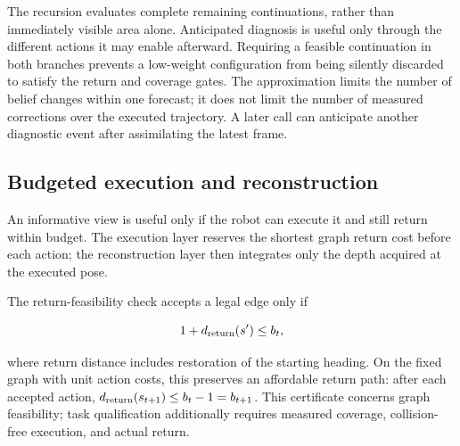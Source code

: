 \documentclass[11pt,a4paper]{article}
\providecommand{\hypertarget}[2]{#2}
\begin{document}
The recursion evaluates complete remaining continuations, rather than immediately visible area alone. Anticipated diagnosis is useful only through the different actions it may enable afterward. Requiring a feasible continuation in both branches prevents a low-weight configuration from being silently discarded to satisfy the return and coverage gates. The approximation limits the number of belief changes within one forecast; it does not limit the number of measured corrections over the executed trajectory. A later call can anticipate another diagnostic event after assimilating the latest frame.

\hypertarget{budgeted-execution-and-reconstruction}{%
\subsection{Budgeted execution and reconstruction}\label{budgeted-execution-and-reconstruction}}

An informative view is useful only if the robot can execute it and still return within budget. The execution layer reserves the shortest graph return cost before each action; the reconstruction layer then integrates only the depth acquired at the executed pose.

The return-feasibility check accepts a legal edge only if

\[
1+d_{\rm return}(s')\le b_t,
\]

where return distance includes restoration of the starting heading. On the fixed graph with unit action costs, this preserves an affordable return path: after each accepted action, \(d_{\rm return}(s_{t+1})\le b_t-1=b_{t+1}\). This certificate concerns graph feasibility; task qualification additionally requires measured coverage, collision-free execution, and actual return.
\end{document}
